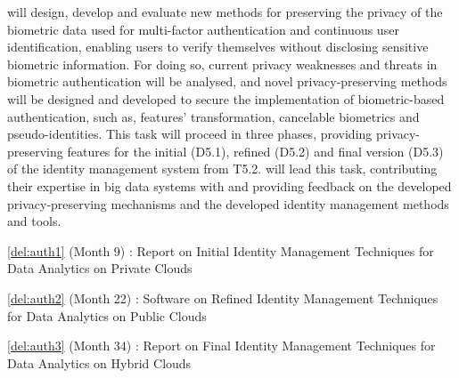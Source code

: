\begin{Workpackage}{\thewpno}
\begin{Task}
\TaskResults{%
\ref{del:auth2},
\ref{del:auth3},
\ref{del:auth4}
}
\TaskHeader{}
\theTask{} will design, develop and evaluate new methods for preserving the privacy of the biometric data used for multi-factor authentication and continuous user identification, enabling users to verify themselves without disclosing sensitive biometric information. For doing so, current privacy weaknesses and threats in biometric authentication will be analysed, and novel privacy-preserving methods will be designed and developed to secure the implementation of biometric-based authentication, such as, features' transformation, cancelable biometrics and pseudo-identities. This task will proceed in three phases, providing privacy-preserving features for the initial (D5.1), refined (D5.2) and final version (D5.3) of the identity management system from T5.2. \UODshort{} will lead this task, contributing their expertise in big data systems with \FRQshort{} and \COGNIshort{} providing feedback on the developed privacy-preserving mechanisms and the developed identity management methods and tools.
\end{Task}


\begin{WPDeliverables}
  \begin{compactitem}
  \item \ref{del:auth1} (Month 9) : Report on Initial Identity Management Techniques for Data Analytics on Private Clouds
	\item \ref{del:auth2} (Month 22) : Software on Refined Identity Management Techniques for Data Analytics on Public Clouds
\item \ref{del:auth3} (Month 34) : Report on Final Identity Management Techniques for Data Analytics on Hybrid Clouds
\end{compactitem}
\end{WPDeliverables}
\end{Workpackage}
